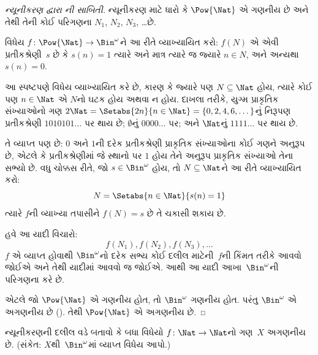 \begin{proof}[ન્યૂનીકરણ દ્વારા {}ની સાબિતી]
ન્યૂનીકરણ માટે ધારો કે $\Pow{\Nat}$ એ ગણનીય છે અને તેથી
તેની કોઈ પરિગણના $N_{1}$, $N_{2}$, $N_{3}$, \dots છે.

વિધેય $f \colon \Pow{\Nat} \to \Bin^\omega$ને આ રીતે વ્યાખ્યાયિત
કરો: $f(N)$ એ એવી પ્રતીકશ્રેણી~$s$ છે કે $s(n) = 1$ ત્યારે અને
માત્ર ત્યારે જ જ્યારે $n \in N$, અને અન્યથા $s(n) = 0$.

આ સ્પષ્ટપણે વિધેય વ્યાખ્યાયિત કરે છે, કારણ કે જ્યારે પણ
$N \subseteq \Nat$ હોય, ત્યારે કોઈ પણ $n \in \Nat$ એ $N$નો
ઘટક હોય અથવા ન હોય. દાખલા તરીકે, યુગ્મ પ્રાકૃતિક સંખ્યાઓનો
ગણ $2\Nat = \Setabs{2n}{n \in \Nat} = \{0,2, 4, 6,
\dots\}$નું નિરૂપણ પ્રતીકશ્રેણી $1010101\dots$ પર થાય છે;
$\emptyset$નું $0000\dots$ પર; અને $\Nat$નું $1111\dots$ પર થાય છે.

તે વ્યાપ્ત પણ છે: $0$ અને $1$ની દરેક પ્રતીકશ્રેણી પ્રાકૃતિક
સંખ્યાઓના કોઈ ગણને અનુરૂપ છે, એટલે કે પ્રતીકશ્રેણીમાં જે સ્થાનો પર
$1$ હોય તેને અનુરૂપ પ્રાકૃતિક સંખ્યાઓ તેના સભ્યો છે. વધુ ચોક્કસ રીતે,
જો $s \in \Bin^\omega$ હોય, તો $N \subseteq \Nat$ને આ રીતે
વ્યાખ્યાયિત કરો:
\[
N = \Setabs{n \in \Nat}{s(n) = 1}
\]
ત્યારે $f$ની વ્યાખ્યા તપાસીને $f(N) = s$ છે તે ચકાસી શકાય છે.

હવે આ યાદી વિચારો:
\[
f(N_1), f(N_2), f(N_3), \dots
\]
$f$ એ વ્યાપ્ત હોવાથી $\Bin^\omega$નો દરેક સભ્ય કોઈ
દલીલ માટેની~$f$ની કિંમત તરીકે આવવો જોઈએ અને તેથી યાદીમાં આવવો જ
જોઈએ. આથી આ યાદી આખા~$\Bin^\omega$ની પરિગણના કરે છે.

એટલે જો $\Pow{\Nat}$ એ ગણનીય હોત, તો $\Bin^\omega$
ગણનીય હોત. પરંતુ $\Bin^\omega$ એ અગણનીય છે
(). તેથી $\Pow{\Nat}$ એ
અગણનીય છે.
\end{proof}


\begin{prob}\label{sfr:siz:red-alt:prob:nat-nat}
  ન્યૂનીકરણની દલીલ વડે બતાવો કે બધા વિધેયો
  $f\colon \Nat \to \Nat$નો ગણ~$X$ અગણનીય છે.
  (સંકેત: $X$થી~$\Bin^\omega$માં વ્યાપ્ત વિધેય આપો.)
\end{prob}


